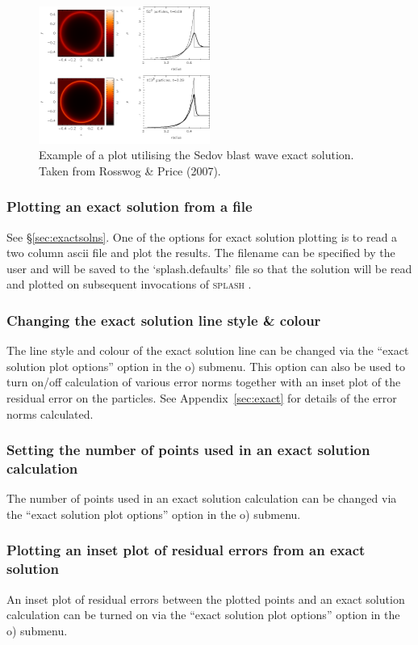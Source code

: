 \documentclass[a4paper,10pt]{article}
\newcommand{\splash}{\textsc{splash }}
\begin{document}
\begin{figure}[h]
\begin{center}
\includegraphics[width=0.5\textwidth]{sedov_example.png}
\caption{Example of a plot utilising the Sedov blast wave exact solution. Taken from Rosswog \& Price (2007).}
\label{fig:sedov}
\end{center}
\end{figure}


\subsubsection{ Plotting an exact solution from a file}
 See \S\ref{sec:exactsolns}. One of the options for exact solution plotting is to read a two column ascii file and plot the results. The filename can be specified by the user and will be saved to the `splash.defaults' file so that the solution will be read and plotted on subsequent invocations of \splash.

\subsubsection{ Changing the exact solution line style \& colour}
 The line style and colour of the exact solution line can be changed via the ``exact solution plot options'' option in the o) submenu. This option can also be used to turn on/off calculation of various error norms
together with an inset plot of the residual error on the particles. See
Appendix~\ref{sec:exact} for details of the error norms calculated.

\subsubsection{ Setting the number of points used in an exact solution calculation}
The number of points used in an exact solution calculation can be changed via the ``exact solution plot options'' option in the o) submenu.

\subsubsection{ Plotting an inset plot of residual errors from an exact solution}
 An inset plot of residual errors between the plotted points and an exact solution calculation can be turned on via the ``exact solution plot options'' option in the o) submenu.
\end{document}
